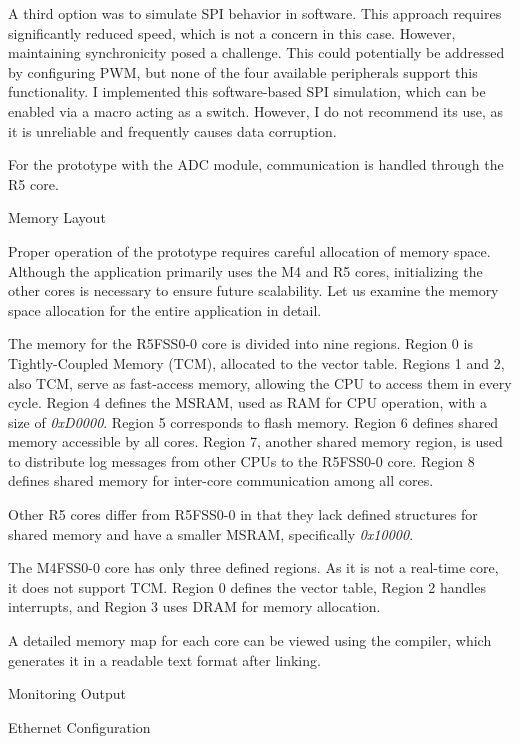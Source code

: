 A third option was to simulate SPI behavior in software. This approach requires significantly reduced speed, which is not a concern in this case. However, maintaining synchronicity posed a challenge. This could potentially be addressed by configuring PWM, but none of the four available peripherals support this functionality. I implemented this software-based SPI simulation, which can be enabled via a macro acting as a switch. However, I do not recommend its use, as it is unreliable and frequently causes data corruption.

For the prototype with the ADC module, communication is handled through the R5 core.

\sec Memory Layout

Proper operation of the prototype requires careful allocation of memory space. Although the application primarily uses the M4 and R5 cores, initializing the other cores is necessary to ensure future scalability. Let us examine the memory space allocation for the entire application in detail.

The memory for the R5FSS0-0 core is divided into nine regions. Region 0 is Tightly-Coupled Memory (TCM), allocated to the vector table. Regions 1 and 2, also TCM, serve as fast-access memory, allowing the CPU to access them in every cycle. Region 4 defines the MSRAM, used as RAM for CPU operation, with a size of {\it 0xD0000}. Region 5 corresponds to flash memory. Region 6 defines shared memory accessible by all cores. Region 7, another shared memory region, is used to distribute log messages from other CPUs to the R5FSS0-0 core. Region 8 defines shared memory for inter-core communication among all cores.

Other R5 cores differ from R5FSS0-0 in that they lack defined structures for shared memory and have a smaller MSRAM, specifically {\it 0x10000}.

The M4FSS0-0 core has only three defined regions. As it is not a real-time core, it does not support TCM. Region 0 defines the vector table, Region 2 handles interrupts, and Region 3 uses DRAM for memory allocation.

A detailed memory map for each core can be viewed using the compiler, which generates it in a readable text format after linking.

\sec Monitoring Output

\secc Ethernet Configuration

